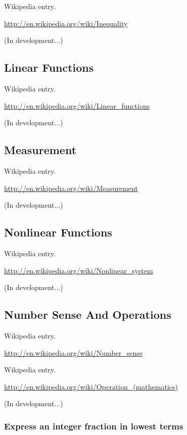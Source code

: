 \documentclass[12pt,twoside]{book}
\begin{document}
Wikipedia entry.

\href{http://en.wikipedia.org/wiki/Inequality}{http://en.wikipedia.org/wiki/Inequality}

(In development...)

\subsection[Linear Functions]{Linear Functions}

Wikipedia entry.

\href{http://en.wikipedia.org/wiki/Linear_functions}{http://en.wikipedia.org/wiki/Linear\_functions}

(In development...)

\subsection[Measurement]{Measurement}

Wikipedia entry.

\href{http://en.wikipedia.org/wiki/Measurement}{http://en.wikipedia.org/wiki/Measurement}

(In development...)

\subsection[Nonlinear Functions]{Nonlinear Functions}

Wikipedia entry.

\href{http://en.wikipedia.org/wiki/Nonlinear_system}{http://en.wikipedia.org/wiki/Nonlinear\_system}

(In development...)

\subsection[Number Sense And Operations]{Number Sense And Operations}

Wikipedia entry.

\href{http://en.wikipedia.org/wiki/Number_sense}{http://en.wikipedia.org/wiki/Number\_sense}


Wikipedia entry.

\href{http://en.wikipedia.org/wiki/Operation_(mathematics)}{http://en.wikipedia.org/wiki/Operation\_(mathematics)}

(In development...)

\subsubsection[Express an integer fraction in lowest terms]{Express an integer fraction in lowest terms}
\end{document}
